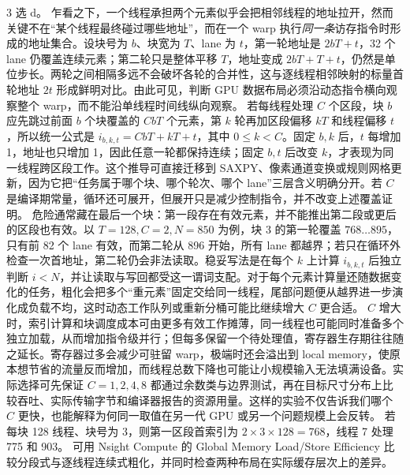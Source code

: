 \begin{solutionexercise}{3}
\conclusionheading 选 d。
\discussionheading
{}
乍看之下，一个线程承担两个元素似乎会把相邻线程的地址拉开，然而关键不在“某个线程最终碰过哪些地址”，而在一个 warp 执行\emph{同一条}访存指令时形成的地址集合。设块号为 $b$、块宽为 $T$、lane 为 $t$，第一轮地址是 $2bT+t$，32 个 lane 仍覆盖连续元素；第二轮只是整体平移 $T$，地址变成 $2bT+T+t$，仍然是单位步长。两轮之间相隔多远不会破坏各轮的合并性，这与逐线程相邻映射的标量首轮地址 $2t$ 形成鲜明对比。由此可见，判断 GPU 数据布局必须沿动态指令横向观察整个 warp，而不能沿单线程时间线纵向观察。
若每线程处理 $C$ 个区段，块 $b$ 应先跳过前面 $b$ 个块覆盖的 $CbT$ 个元素，第 $k$ 轮再加区段偏移 $kT$ 和线程偏移 $t$，所以统一公式是 $i_{b,k,t}=CbT+kT+t$，其中 $0\le k<C$。固定 $b,k$ 后，$t$ 每增加 1，地址也只增加 1，因此任意一轮都保持连续；固定 $b,t$ 后改变 $k$，才表现为同一线程跨区段工作。这个推导可直接迁移到 SAXPY、像素通道变换或规则网格更新，因为它把“任务属于哪个块、哪个轮次、哪个 lane”三层含义明确分开。若 $C$ 是编译期常量，循环还可展开，但展开只是减少控制指令，并不改变上述覆盖证明。
危险通常藏在最后一个块：第一段存在有效元素，并不能推出第二段或更后的区段也有效。以 $T=128,C=2,N=850$ 为例，块 3 的第一轮覆盖 $768\ldots895$，只有前 82 个 lane 有效，而第二轮从 896 开始，所有 lane 都越界；若只在循环外检查一次首地址，第二轮仍会非法读取。稳妥写法是在每个 $k$ 上计算 $i_{b,k,t}$ 后独立判断 $i<N$，并让读取与写回都受这一谓词支配。对于每个元素计算量还随数据变化的任务，粗化会把多个“重元素”固定交给同一线程，尾部问题便从越界进一步演化成负载不均，这时动态工作队列或重新分桶可能比继续增大 $C$ 更合适。
$C$ 增大时，索引计算和块调度成本可由更多有效工作摊薄，同一线程也可能同时准备多个独立加载，从而增加指令级并行；但每多保留一个待处理值，寄存器生存期往往随之延长。寄存器过多会减少可驻留 warp，极端时还会溢出到 local memory，使原本想节省的流量反而增加，而线程总数下降也可能让小规模输入无法填满设备。实际选择可先保证 $C=1,2,4,8$ 都通过余数类与边界测试，再在目标尺寸分布上比较吞吐、实际传输字节和编译器报告的资源用量。这样的实验不仅告诉我们哪个 $C$ 更快，也能解释为何同一取值在另一代 GPU 或另一个问题规模上会反转。
\variantheading 若每块 128 线程、块号为 3，则第一区段首索引为 $2\times3\times128=768$，线程 7 处理 775 和 903。
\practiceheading 可用 Nsight Compute 的 Global Memory Load/Store Efficiency 比较分段式与逐线程连续式粗化，并同时检查两种布局在实际缓存层次上的差异。
\end{solutionexercise}

